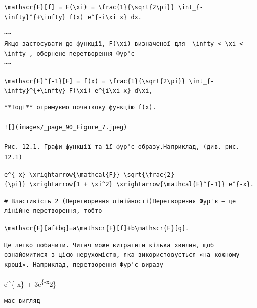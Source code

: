 \documentclass[
  ukrainian,
]{article}
\begin{document}
\texttt{\textbackslash{}mathscr\{F\}{[}f{]}\ =\ F(\textbackslash{}xi)\ =\ \textbackslash{}frac\{1\}\{\textbackslash{}sqrt\{2\textbackslash{}pi\}\}\ \textbackslash{}int\_\{-\textbackslash{}infty\}\^{}\{+\textbackslash{}infty\}\ f(x)\ e\^{}\{-i\textbackslash{}xi\ x\}\ dx.}

\begin{verbatim}
~~
Якщо застосувати до функції, F(\xi) визначеної для -\infty < \xi < \infty , обернене перетворення Фур'є
~~
\end{verbatim}

\texttt{\textbackslash{}mathscr\{F\}\^{}\{-1\}{[}F{]}\ =\ f(x)\ =\ \textbackslash{}frac\{1\}\{\textbackslash{}sqrt\{2\textbackslash{}pi\}\}\ \textbackslash{}int\_\{-\textbackslash{}infty\}\^{}\{+\textbackslash{}infty\}\ F(\textbackslash{}xi)\ e\^{}\{i\textbackslash{}xi\ x\}\ d\textbackslash{}xi,}

\begin{verbatim}
**Тоді** отримуємо початкову функцію f(x).

![](images/_page_90_Figure_7.jpeg)

Рис. 12.1. Графи функції та її фур'є-образу.Наприклад, (див. рис. 12.1)
\end{verbatim}

\texttt{e\^{}\{-\textbar{}x\textbar{}\}\ \textbackslash{}xrightarrow\{\textbackslash{}mathcal\{F\}\}\ \textbackslash{}sqrt\{\textbackslash{}frac\{2\}\{\textbackslash{}pi\}\}\ \textbackslash{}xrightarrow\{1\ +\ \textbackslash{}xi\^{}2\}\ \textbackslash{}xrightarrow\{\textbackslash{}mathcal\{F\}\^{}\{-1\}\}\ e\^{}\{-\textbar{}x\textbar{}\}.}

\begin{verbatim}
# Властивість 2 (Перетворення лінійності)Перетворення Фур'є — це лінійне перетворення, тобто
\end{verbatim}

\texttt{\textbackslash{}mathscr\{F\}{[}af+bg{]}=a\textbackslash{}mathscr\{F\}{[}f{]}+b\textbackslash{}mathscr\{F\}{[}g{]}.}

\begin{verbatim}
Це легко побачити. Читач може витратити кілька хвилин, щоб ознайомитися з цією нерухомістю, яка використовується «на кожному кроці». Наприклад, перетворення Фур'є виразу
\end{verbatim}

e\^{}\{-x\} + 3e\textsuperscript{\{-x}2\}

\begin{verbatim}
має вигляд
\end{verbatim}
\end{document}
